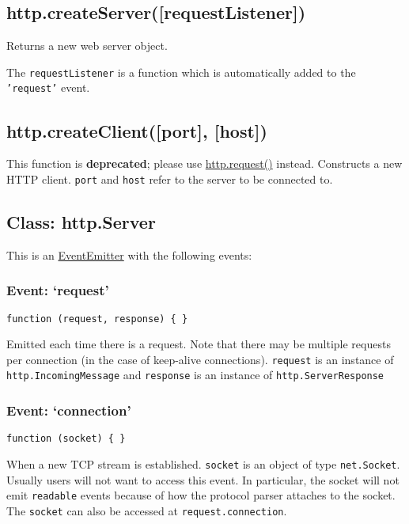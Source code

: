 \subsection{http.createServer({[}requestListener{]})}

Returns a new web server object.

The \texttt{requestListener} is a function which is automatically added
to the \texttt{'request'} event.

\subsection{http.createClient({[}port{]}, {[}host{]})}

This function is \textbf{deprecated}; please use
\hyperref[http\_http\_request\_options\_callback]{http.request()}
instead. Constructs a new HTTP client. \texttt{port} and \texttt{host}
refer to the server to be connected to.

\subsection{Class: http.Server}

This is an
\href{events.html\#events\_class\_events\_eventemitter}{EventEmitter}
with the following events:

\subsubsection{Event: `request'}

\texttt{function (request, response) \{ \}}

Emitted each time there is a request. Note that there may be multiple
requests per connection (in the case of keep-alive connections).
\texttt{request} is an instance of \texttt{http.IncomingMessage} and
\texttt{response} is an instance of \texttt{http.ServerResponse}

\subsubsection{Event: `connection'}

\texttt{function (socket) \{ \}}

When a new TCP stream is established. \texttt{socket} is an object of
type \texttt{net.Socket}. Usually users will not want to access this
event. In particular, the socket will not emit \texttt{readable} events
because of how the protocol parser attaches to the socket. The
\texttt{socket} can also be accessed at \texttt{request.connection}.

